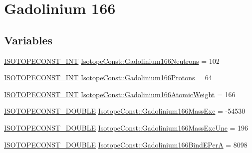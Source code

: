 \hypertarget{group___isotope_const-_gadolinium-_gd166}{}\section{Gadolinium 166}
\label{group___isotope_const-_gadolinium-_gd166}
\subsection*{Variables}
\begin{DoxyCompactItemize}
\item 
\mbox{\hyperlink{group___isotope_const-_macros_ga5f18360b3e99483a35c32d789e62621c}{I\+S\+O\+T\+O\+P\+E\+C\+O\+N\+S\+T\+\_\+\+I\+NT}} \mbox{\hyperlink{group___isotope_const-_gadolinium-_gd166_ga506637dbdb8b3689e91506312938bb60}{Isotope\+Const\+::\+Gadolinium166\+Neutrons}} = 102
\item 
\mbox{\hyperlink{group___isotope_const-_macros_ga5f18360b3e99483a35c32d789e62621c}{I\+S\+O\+T\+O\+P\+E\+C\+O\+N\+S\+T\+\_\+\+I\+NT}} \mbox{\hyperlink{group___isotope_const-_gadolinium-_gd166_gae1088f4e8207bb47be3f22f57a7540ea}{Isotope\+Const\+::\+Gadolinium166\+Protons}} = 64
\item 
\mbox{\hyperlink{group___isotope_const-_macros_ga5f18360b3e99483a35c32d789e62621c}{I\+S\+O\+T\+O\+P\+E\+C\+O\+N\+S\+T\+\_\+\+I\+NT}} \mbox{\hyperlink{group___isotope_const-_gadolinium-_gd166_ga44d1bb11c193451e9fbbc8ccd40c4c34}{Isotope\+Const\+::\+Gadolinium166\+Atomic\+Weight}} = 166
\item 
\mbox{\hyperlink{group___isotope_const-_macros_ga8f45a7272ce02c0b4c65c44636ed719a}{I\+S\+O\+T\+O\+P\+E\+C\+O\+N\+S\+T\+\_\+\+D\+O\+U\+B\+LE}} \mbox{\hyperlink{group___isotope_const-_gadolinium-_gd166_gaa190790c9fa20056922c0daf2d86737a}{Isotope\+Const\+::\+Gadolinium166\+Mass\+Exc}} = -\/54530
\item 
\mbox{\hyperlink{group___isotope_const-_macros_ga8f45a7272ce02c0b4c65c44636ed719a}{I\+S\+O\+T\+O\+P\+E\+C\+O\+N\+S\+T\+\_\+\+D\+O\+U\+B\+LE}} \mbox{\hyperlink{group___isotope_const-_gadolinium-_gd166_gadb0cc5e63c6675525f3de24871acb813}{Isotope\+Const\+::\+Gadolinium166\+Mass\+Exc\+Unc}} = 196
\item 
\mbox{\hyperlink{group___isotope_const-_macros_ga8f45a7272ce02c0b4c65c44636ed719a}{I\+S\+O\+T\+O\+P\+E\+C\+O\+N\+S\+T\+\_\+\+D\+O\+U\+B\+LE}} \mbox{\hyperlink{group___isotope_const-_gadolinium-_gd166_gaa8b8377419733d02aca7da6847a91068}{Isotope\+Const\+::\+Gadolinium166\+Bind\+E\+PerA}} = 8098
\item 

\end{DoxyCompactItemize}
